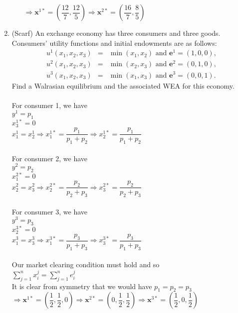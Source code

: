 \documentclass[11pt]{article}
\begin{document}
\begin{enumerate}
\begin{itemize}
	$\Rightarrow\textbf{x}^{1*}=(\dfrac{12}{7},\dfrac{12}{5})\Rightarrow\textbf{x}^{2*}=(\dfrac{16}{7},\dfrac{8}{5})$
	\end{itemize}
\pagebreak
\item (Scarf) An exchange economy has three consumers and three goods. Consumers' utility functions and initial endowments are as follows:
	\begin{eqnarray*}
	u^{1}(x_{1},x_{2},x_{3})&=&\min(x_{1},x_{2})\text{ and }\mathbf{e}^{1}=(1,0,0),\\
	u^{2}(x_{1},x_{2},x_{3})&=&\min(x_{2},x_{3})\text{ and }\mathbf{e}^{2}=(0,1,0),\\
	u^{3}(x_{1},x_{2},x_{3})&=&\min(x_{1},x_{3})\text{ and }\mathbf{e}^{3}=(0,0,1).	
	\end{eqnarray*}
	Find a Walrasian equilibrium and the associated WEA for this economy.\\\\
    For consumer 1, we have\\
    $y^1=p_1$\\
    $x_3^{1*}=0$\\
    $x_1^1=x_2^1\Rightarrow x_1^{1*}=\dfrac{p_1}{p_1+p_2}\Rightarrow x_2^{1*}=\dfrac{p_1}{p_1+p_2}$\\\\
    For consumer 2, we have\\
    $y^2=p_2$\\
    $x_1^{2*}=0$\\
    $x_2^2=x_3^2\Rightarrow x_2^{2*}=\dfrac{p_2}{p_2+p_3}\Rightarrow x_3^{2*}=\dfrac{p_2}{p_2+p_3}$\\\\
    For consumer 3, we have\\
    $y^3=p_3$\\
    $x_2^{3*}=0$\\
    $x_1^3=x_3^3\Rightarrow x_1^{3*}=\dfrac{p_3}{p_1+p_3}\Rightarrow x_3^{3*}=\dfrac{p_3}{p_1+p_3}$\\\\
    Our market clearing condition must hold and so\\
    $\sum_{j=1}^nx_i^j=\sum_{j=1}^ne_i^j$\\
    It is clear from symmetry that we would have $p_1=p_2=p_3$\\
    $\Rightarrow\textbf{x}^{1*}=(\dfrac{1}{2},\dfrac{1}{2},0)\Rightarrow\textbf{x}^{2*}=(0,\dfrac{1}{2},\dfrac{1}{2})\Rightarrow\textbf{x}^{3*}=(\dfrac{1}{2},0,\dfrac{1}{2})$
\end{enumerate}
\end{document}
